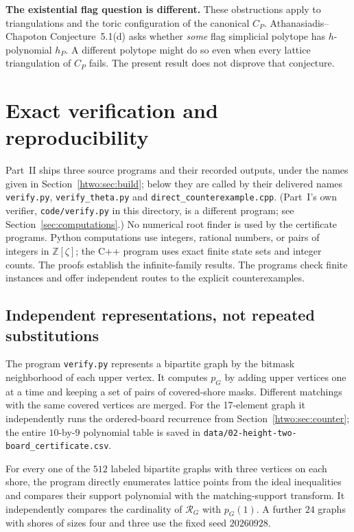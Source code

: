 \documentclass[11pt]{article}
\numberwithin{equation}{section}
\theoremstyle{definition}
\newcommand{\Z}{\mathbb Z}
\begin{document}
\begin{statusbox}
\small\textbf{The existential flag question is different.} These obstructions
apply to triangulations and the toric configuration of the canonical
$C_P$. Athanasiadis--Chapoton Conjecture~5.1(d) asks whether \emph{some}
flag simplicial polytope has $h$-polynomial $h_P$. A different polytope
might do so even when every lattice triangulation of $C_P$ fails.
The present result does not disprove that conjecture.
\end{statusbox}

\section{Exact verification and reproducibility}\label{htwo:sec:computations}

Part~II ships three source programs and their recorded outputs, under the
names given in Section~\ref{htwo:sec:build}; below they are called by their
delivered names \texttt{verify.py}, \texttt{verify\_theta.py} and
\texttt{direct\_counterexample.cpp}. (Part~I's own verifier,
\texttt{code/verify.py} in this directory, is a different program; see
Section~\ref{sec:computations}.)
No numerical root finder is used by the certificate programs. Python
computations use integers, rational numbers, or pairs of integers in
$\Z[\zeta]$; the C++ program uses exact finite state sets and integer
counts. The proofs establish the infinite-family results. The programs
check finite instances and offer independent routes to the explicit
counterexamples.

\subsection{Independent representations, not repeated substitutions}

The program \texttt{verify.py} represents a bipartite graph by the
bitmask neighborhood of each upper vertex. It computes $p_G$ by adding
upper vertices one at a time and keeping a set of pairs of covered-shore
masks. Different matchings with the same covered vertices are merged.
For the 17-element graph it independently runs the ordered-board
recurrence from Section~\ref{htwo:sec:counter}; the entire $10$-by-$9$
polynomial table is saved in
\nolinkurl{data/02-height-two-board_certificate.csv}.

For every one of the $512$ labeled bipartite graphs with three vertices
on each shore, the program directly enumerates lattice points from the
ideal inequalities and compares their support polynomial with the
matching-support transform. It independently compares the cardinality of
$\mathcal R_G$ with $p_G(1)$. A further $24$ graphs with shores of sizes
four and three use the fixed seed $20260928$.
\end{document}
